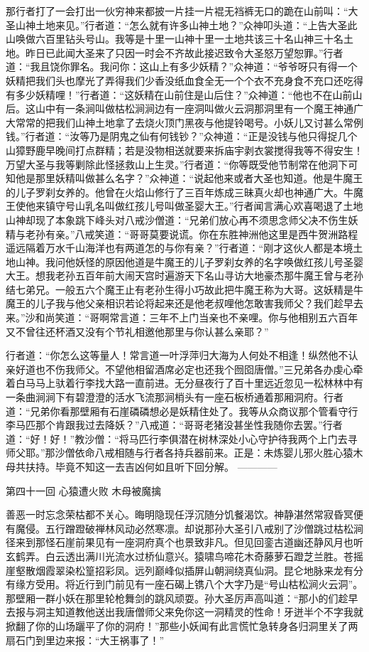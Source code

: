 \documentclass[12pt,UTF8]{ctexbook}
\begin{document}
那行者打了一会打出一伙穷神来都披一片挂一片裩无裆裤无口的跪在山前叫：“大圣山神土地来见。”行者道：“怎么就有许多山神土地？”众神叩头道：“上告大圣此山唤做六百里钻头号山。我等是十里一山神十里一土地共该三十名山神三十名土地。昨日已此闻大圣来了只因一时会不齐故此接迟致令大圣怒万望恕罪。”行者道：“我且饶你罪名。我问你：这山上有多少妖精？”众神道：“爷爷呀只有得一个妖精把我们头也摩光了弄得我们少香没纸血食全无一个个衣不充身食不充口还吃得有多少妖精哩！”行者道：“这妖精在山前住是山后住？”众神道：“他也不在山前山后。这山中有一条涧叫做枯松涧涧边有一座洞叫做火云洞那洞里有一个魔王神通广大常常的把我们山神土地拿了去烧火顶门黑夜与他提铃喝号。小妖儿又讨甚么常例钱。”行者道：“汝等乃是阴鬼之仙有何钱钞？”众神道：“正是没钱与他只得捉几个山獐野鹿早晚间打点群精；若是没物相送就要来拆庙宇剥衣裳搅得我等不得安生！万望大圣与我等剿除此怪拯救山上生灵。”行者道：“你等既受他节制常在他洞下可知他是那里妖精叫做甚么名字？”众神道：“说起他来或者大圣也知道。他是牛魔王的儿子罗刹女养的。他曾在火焰山修行了三百年炼成三昧真火却也神通广大。牛魔王使他来镇守号山乳名叫做红孩儿号叫做圣婴大王。”行者闻言满心欢喜喝退了土地山神却现了本象跳下峰头对八戒沙僧道：“兄弟们放心再不须思念师父决不伤生妖精与老孙有亲。”八戒笑道：“哥哥莫要说谎。你在东胜神洲他这里是西牛贺洲路程遥远隔着万水千山海洋也有两道怎的与你有亲？”行者道：“刚才这伙人都是本境土地山神。我问他妖怪的原因他道是牛魔王的儿子罗刹女养的名字唤做红孩儿号圣婴大王。想我老孙五百年前大闹天宫时遍游天下名山寻访大地豪杰那牛魔王曾与老孙结七弟兄。一般五六个魔王止有老孙生得小巧故此把牛魔王称为大哥。这妖精是牛魔王的儿子我与他父亲相识若论将起来还是他老叔哩他怎敢害我师父？我们趁早去来。”沙和尚笑道：“哥啊常言道：三年不上门当亲也不亲哩。你与他相别五六百年又不曾往还杯酒又没有个节礼相邀他那里与你认甚么亲耶？”

行者道：“你怎么这等量人！常言道一叶浮萍归大海为人何处不相逢！纵然他不认亲好道也不伤我师父。不望他相留酒席必定也还我个囫囵唐僧。”三兄弟各办虔心牵着白马马上驮着行李找大路一直前进。无分昼夜行了百十里远近忽见一松林林中有一条曲涧涧下有碧澄澄的活水飞流那涧梢头有一座石板桥通着那厢洞府。行者道：“兄弟你看那壁厢有石崖磷磷想必是妖精住处了。我等从众商议那个管看守行李马匹那个肯跟我过去降妖？”八戒道：“哥哥老猪没甚坐性我随你去罢。”行者道：“好！好！”教沙僧：“将马匹行李俱潜在树林深处小心守护待我两个上门去寻师父耶。”那沙僧依命八戒相随与行者各持兵器前来。正是：未炼婴儿邪火胜心猿木母共扶持。毕竟不知这一去吉凶何如且听下回分解。
------------

第四十一回 心猿遭火败 木母被魔擒

善恶一时忘念荣枯都不关心。晦明隐现任浮沉随分饥餐渴饮。神静湛然常寂昏冥便有魔侵。五行蹭蹬破禅林风动必然寒凛。却说那孙大圣引八戒别了沙僧跳过枯松涧径来到那怪石崖前果见有一座洞府真个也景致非凡。但见回銮古道幽还静风月也听玄鹤弄。白云透出满川光流水过桥仙意兴。猿啸鸟啼花木奇藤萝石蹬芝兰胜。苍摇崖壑散烟霞翠染松篁招彩凤。远列巅峰似插屏山朝涧绕真仙洞。昆仑地脉来龙有分有缘方受用。将近行到门前见有一座石碣上镌八个大字乃是“号山枯松涧火云洞”。那壁厢一群小妖在那里轮枪舞剑的跳风顽耍。孙大圣厉声高叫道：“那小的们趁早去报与洞主知道教他送出我唐僧师父来免你这一洞精灵的性命！牙迸半个不字我就掀翻了你的山场躧平了你的洞府！”那些小妖闻有此言慌忙急转身各归洞里关了两扇石门到里边来报：“大王祸事了！”
\end{document}
